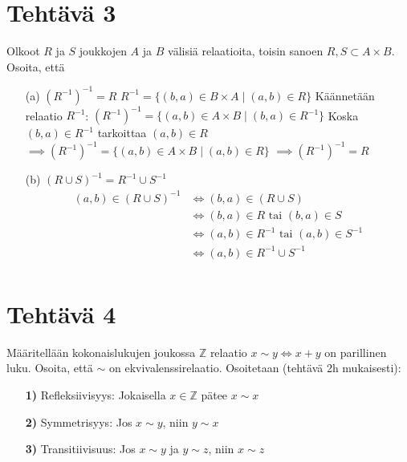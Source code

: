 \documentclass{article}
\begin{document}
    \newpage
	\section*{Tehtävä 3}
    Olkoot $R$ ja $S$ joukkojen $A$ ja $B$ välisiä relaatioita, toisin sanoen $R, S  \subset  A \times B$. Osoita, että
    \begin{enumerate}
        \item[(a)] $(R^{-1})^{-1} = R$ \newline
        $R^{-1} = \{ (b, a) \in B \times A \mid (a, b) \in R \}$\newline
        Käännetään relaatio $R^{-1}$:\newline
        $(R^{-1})^{-1} = \{ (a, b) \in A \times B \mid (b, a) \in R^{-1} \}$\newline
        Koska $(b, a) \in R^{-1}$ tarkoittaa $(a, b) \in R$\newline
        $\implies (R^{-1})^{-1} = \{ (a, b) \in A \times B \mid (a, b) \in R \}$\newline
        $\implies  (R^{-1})^{-1} = R$
        \item[(b)] $(R \cup S)^{-1} = R^{-1} \cup S^{-1} $
        \[
            \begin{aligned}
                (a,b) \in (R \cup S)^{-1} &\Longleftrightarrow (b,a) \in (R \cup S)\\
                &\Longleftrightarrow (b,a) \in R \text{ tai } (b,a) \in S\\
                &\Longleftrightarrow (a,b) \in R^{-1} \text{ tai } (a,b) \in S^{-1}\\
                &\Longleftrightarrow (a,b) \in R^{-1} \cup S^{-1}\\
            \end{aligned}
        \]
        \end{enumerate}


        \newpage
        \section*{Tehtävä 4}
        Määritellään kokonaislukujen joukossa $\mathbb{Z}$ relaatio $x \sim y \Longleftrightarrow x + y$ on parillinen luku. Osoita, että $\sim$ on ekvivalenssirelaatio.\newline
        Osoitetaan (tehtävä 2h mukaisesti):
        \begin{itemize}
            \item[\textbf{1)}] Refleksiivisyys: Jokaisella $x \in \mathbb{Z}$ pätee $x \sim x$
            \item[\textbf{2)}] Symmetrisyys: Jos $x \sim y$, niin $y \sim x$
            \item[\textbf{3)}] Transitiivisuus: Jos $x \sim y$ ja $y \sim z$, niin $x \sim z$ 
        \end{itemize}
    
\end{document}
